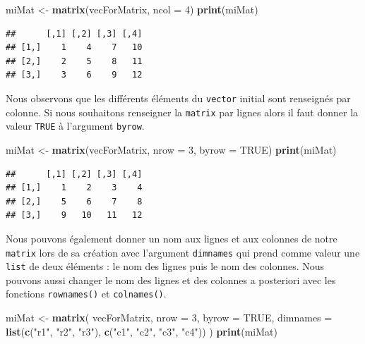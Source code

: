 \documentclass[]{book}
\newenvironment{Shaded}{\begin{snugshade}}{\end{snugshade}}
\newcommand{\DataTypeTok}[1]{\textcolor[rgb]{0.13,0.29,0.53}{#1}}
\newcommand{\DecValTok}[1]{\textcolor[rgb]{0.00,0.00,0.81}{#1}}
\newcommand{\KeywordTok}[1]{\textcolor[rgb]{0.13,0.29,0.53}{\textbf{#1}}}
\newcommand{\NormalTok}[1]{#1}
\newcommand{\OtherTok}[1]{\textcolor[rgb]{0.56,0.35,0.01}{#1}}
\newcommand{\StringTok}[1]{\textcolor[rgb]{0.31,0.60,0.02}{#1}}
\begin{document}
\begin{Shaded}
\begin{Highlighting}[]
\NormalTok{miMat <-}\StringTok{ }\KeywordTok{matrix}\NormalTok{(vecForMatrix, }\DataTypeTok{ncol =} \DecValTok{4}\NormalTok{)}
\KeywordTok{print}\NormalTok{(miMat)}
\end{Highlighting}
\end{Shaded}

\begin{verbatim}
##      [,1] [,2] [,3] [,4]
## [1,]    1    4    7   10
## [2,]    2    5    8   11
## [3,]    3    6    9   12
\end{verbatim}

Nous observons que les différents éléments du \texttt{vector} initial sont renseignés par colonne. Si nous souhaitons renseigner la \texttt{matrix} par lignes alors il faut donner la valeur \texttt{TRUE} à l'argument \texttt{byrow}.

\begin{Shaded}
\begin{Highlighting}[]
\NormalTok{miMat <-}\StringTok{ }\KeywordTok{matrix}\NormalTok{(vecForMatrix, }\DataTypeTok{nrow =} \DecValTok{3}\NormalTok{, }\DataTypeTok{byrow =} \OtherTok{TRUE}\NormalTok{)}
\KeywordTok{print}\NormalTok{(miMat)}
\end{Highlighting}
\end{Shaded}

\begin{verbatim}
##      [,1] [,2] [,3] [,4]
## [1,]    1    2    3    4
## [2,]    5    6    7    8
## [3,]    9   10   11   12
\end{verbatim}

Nous pouvons également donner un nom aux lignes et aux colonnes de notre \texttt{matrix} lors de sa création avec l'argument \texttt{dimnames} qui prend comme valeur une \texttt{list} de deux éléments : le nom des lignes puis le nom des colonnes. Nous pouvons aussi changer le nom des lignes et des colonnes a posteriori avec les fonctions \texttt{rownames()} et \texttt{colnames()}.

\begin{Shaded}
\begin{Highlighting}[]
\NormalTok{miMat <-}\StringTok{ }\KeywordTok{matrix}\NormalTok{(}
\NormalTok{  vecForMatrix, }
  \DataTypeTok{nrow =} \DecValTok{3}\NormalTok{, }
  \DataTypeTok{byrow =} \OtherTok{TRUE}\NormalTok{, }
  \DataTypeTok{dimnames =} \KeywordTok{list}\NormalTok{(}\KeywordTok{c}\NormalTok{(}\StringTok{"r1"}\NormalTok{, }\StringTok{"r2"}\NormalTok{, }\StringTok{"r3"}\NormalTok{), }\KeywordTok{c}\NormalTok{(}\StringTok{"c1"}\NormalTok{, }\StringTok{"c2"}\NormalTok{, }\StringTok{"c3"}\NormalTok{, }\StringTok{"c4"}\NormalTok{))}
\NormalTok{)}
\KeywordTok{print}\NormalTok{(miMat)}
\end{Highlighting}
\end{Shaded}
\end{document}
